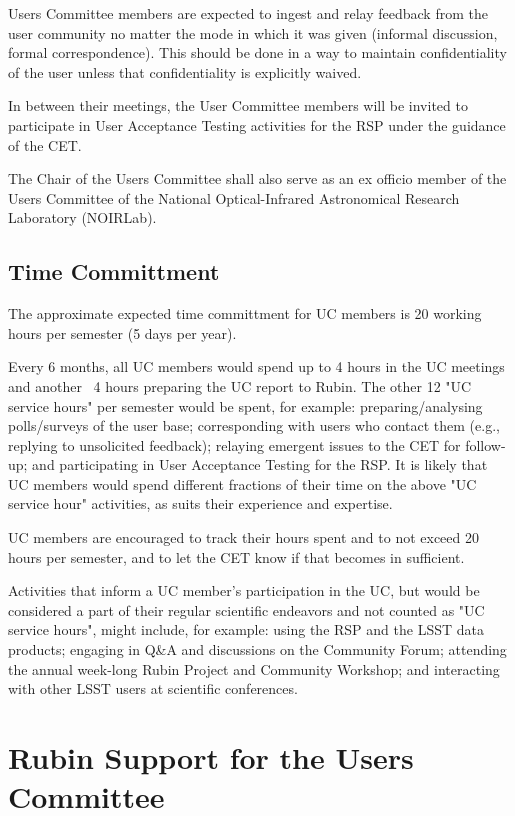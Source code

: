 \documentclass[OPS,toc]{lsstdoc}
\begin{document}
Users Committee members are expected to ingest and relay feedback from the user community no matter the mode in which it was given (informal discussion, formal correspondence).
This should be done in a way to maintain confidentiality of the user unless that confidentiality is explicitly waived. 

In between their meetings, the User Committee members will be invited to participate in User Acceptance Testing activities for the RSP under the guidance of the CET.  

The Chair of the Users Committee shall also serve as an ex officio member of the Users Committee of the National Optical-Infrared Astronomical Research Laboratory (NOIRLab). 

\subsection{Time Committment}

The approximate expected time committment for UC members is 20 working hours per semester (5 days per year).

Every 6 months, all UC members would spend up to 4 hours in the UC meetings and another ~4 hours preparing the UC report to Rubin.
The other 12 "UC service hours" per semester would be spent, for example: preparing/analysing polls/surveys of the user base; corresponding with users who contact them (e.g., replying to unsolicited feedback); relaying emergent issues to the CET for follow-up; and participating in User Acceptance Testing for the RSP. 
It is likely that UC members would spend different fractions of their time on the above "UC service hour" activities, as suits their experience and expertise.

UC members are encouraged to track their hours spent and to not exceed 20 hours per semester, and to let the CET know if that becomes in sufficient. 

Activities that inform a UC member's participation in the UC, but would be considered a part of their regular scientific endeavors and not counted as "UC service hours", might include, for example: using the RSP and the LSST data products; engaging in Q&A and discussions on the Community Forum; attending the annual week-long Rubin Project and Community Workshop; and interacting with other LSST users at scientific conferences.

\section{Rubin Support for the Users Committee}
\end{document}
